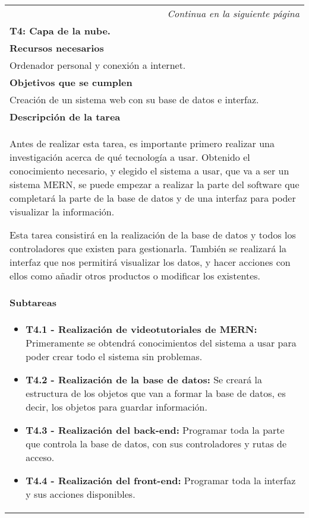 \begin{longtable}{|p{}|}
\hline
\endfirsthead
\endhead
\hline \multicolumn{1}{r}{\textit{Continua en la siguiente página}} \\
\endfoot
\endlastfoot
    \rowcolor[gray]{.5}
    {\color{white}\textbf{T4: Capa de la nube.}} \\
    \hline
    \rowcolor[gray]{.9}
    \textbf{Recursos necesarios} \\
    \hline
    Ordenador personal y conexión a internet. \\
    \hline
    \rowcolor[gray]{.9}
    \textbf{Objetivos que se cumplen} \\
    \hline
    Creación de un sistema web con su base de datos e interfaz.\\
    \hline
    \rowcolor[gray]{.9}
    \textbf{Descripción de la tarea} \\
    \hline
    Antes de realizar esta tarea, es importante primero realizar una investigación acerca de qué tecnología a usar. Obtenido el conocimiento necesario, y elegido el sistema a usar, que va a ser un sistema MERN, se puede empezar a realizar la parte del software que completará la parte de la base de datos y de una interfaz para poder visualizar la información.

    Esta tarea consistirá en la realización de la base de datos y todos los controladores que existen para gestionarla. También se realizará la interfaz que nos permitirá visualizar los datos, y hacer acciones con ellos como añadir otros productos o modificar los existentes.\\
    \hline
    \rowcolor[gray]{.9}
    \textbf{Subtareas} \\
    \hline
    \begin{itemize}
        \item \textbf{T4.1 - Realización de videotutoriales de MERN:} Primeramente se obtendrá conocimientos del sistema a usar para poder crear todo el sistema sin problemas.
        \item \textbf{T4.2 - Realización de la base de datos:} Se creará la estructura de los objetos que van a formar la base de datos, es decir, los objetos para guardar información.
        \item \textbf{T4.3 - Realización del back-end:} Programar toda la parte que controla la base de datos, con sus controladores y rutas de acceso.
        \item \textbf{T4.4 - Realización del front-end:} Programar toda la interfaz y sus acciones disponibles.
    \end{itemize} \\
    \hline
\end{longtable}

